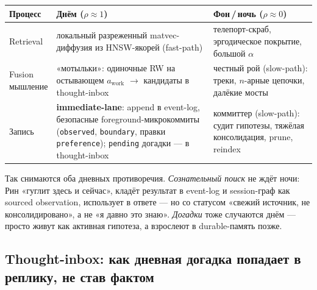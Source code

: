 \begin{center}
\begin{tabular}{p{} p{} p{}}
\toprule
\textbf{Процесс} & \textbf{Днём ($\rho\!\approx\!1$)} & \textbf{Фон\,/\,ночь ($\rho\!\approx\!0$)} \\
\midrule
Retrieval & локальный разреженный matvec-диффузия из HNSW-якорей (fast-path) & телепорт-скраб, эргодическое покрытие, большой $\alpha$ \\
\shortstack[l]{Fusion\\мышление} & «мотыльки»: одиночные RW на остывающем $a_{\text{work}}$ $\to$ кандидаты в thought-inbox & честный рой (slow-path): треки, $n$-арные цепочки, далёкие мосты \\
Запись & \textbf{immediate-lane}: append в event-log, безопасные foreground-микрокоммиты (\texttt{observed}, \texttt{boundary}, правки \texttt{preference}); \texttt{pending} догадки — в thought-inbox & коммиттер (slow-path): судит гипотезы, тяжёлая консолидация, prune, reindex \\
\bottomrule
\end{tabular}
\end{center}

Так снимаются оба дневных противоречия. \emph{Сознательный поиск} не ждёт ночи: Рин
«гуглит здесь и сейчас», кладёт результат в event-log и session-граф как sourced
observation, использует в ответе — но со статусом «свежий источник, не консолидировано»,
а не «я давно это знаю». \emph{Догадки} тоже случаются днём — просто живут как активная
гипотеза, а взрослеют в durable-память позже.

\subsection{Thought-inbox: как дневная догадка попадает в реплику, не став фактом}
\label{sec:thoughtinbox}


